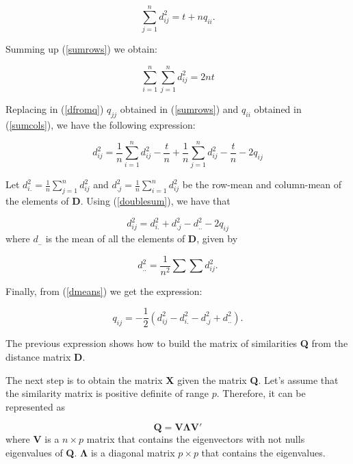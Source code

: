 \documentclass[11pt]{report}
\begin{document}
\begin{equation} \label{sumcols}
\sum_{j = 1}^n d_{ij}^2 = t + nq_{ii}.
\end{equation}

\indent Summing up (\ref{sumrows}) we obtain:

\begin{equation} \label{doublesum}
\sum_{i = 1}^n\sum_{j = 1}^n d_{ij}^2 = 2nt
\end{equation}

\indent Replacing in (\ref{dfromq}) $q_{jj}$ obtained in (\ref{sumrows}) and $q_{ii}$
obtained in (\ref{sumcols}), we have the following expression:

\begin{equation} \label{generaldij}
d_{ij}^2 = \frac{1}{n}\sum_{i = 1}^n d_{ij}^2 - \frac{t}{n} + \frac{1}{n} \sum_{j = 1}^n d_{ij}^2 -\frac{t}{n} -2q_{ij}
\end{equation}

\indent Let $d_{i.}^2 = \frac{1}{n}\sum_{j = 1}^n d_{ij}^2$ and $d_{.j}^2 = \frac{1}{n}\sum_{i=1}^n d_{ij}^2$ 
be the row-mean and column-mean of the elements of \textbf{D}. Using 
(\ref{doublesum}), we have that

\begin{equation} \label{dmeans}
d_{ij}^2 = d_{i.}^2 + d_{.j}^2 - d_{..}^2-2q_{ij}
\end{equation}
where $d_{..}$ is the mean of all the elements of \textbf{D}, given by

\[
d_{..}^2 = \frac{1}{n^2}\sum \sum d_{ij}^2.
\]

\indent Finally, from (\ref{dmeans}) we get the expression:

\begin{equation} \label{qij2}
q_{ij} = -\frac{1}{2}(d_{ij}^2 - d_{i.}^2 - d_{.j}^2 + d_{..}^2).
\end{equation}

\indent The previous expression shows how to build the matrix of similarities 
\textbf{Q} from the distance matrix \textbf{D}.

\indent The next step is to obtain the matrix \textbf{X} given the matrix 
\textbf{Q}. Let's assume that the similarity matrix is positive definite of 
range $p$. Therefore, it can be represented as

\[
\mathbf{Q} = \mathbf{V}\mathbf{\Lambda}\mathbf{V'}
\]
where $\mathbf{V}$ is a $n \times p$ matrix that contains the eigenvectors with
not nulls eigenvalues of \textbf{Q}. $\mathbf{\Lambda}$ is a diagonal matrix 
$p \times p$ that contains the eigenvalues.
\end{document}
